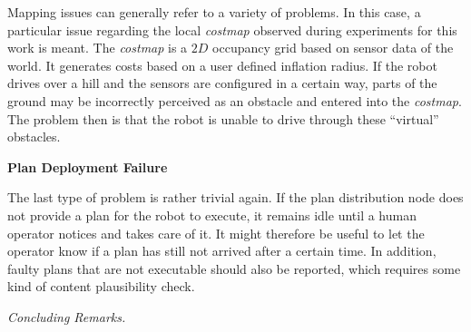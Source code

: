 \documentclass[english, master, utf8]{base/thesis_KBS}
\begin{document}
\noindent
Mapping issues can generally refer to a variety of problems. In this case, a particular issue regarding the local \textit{costmap} observed during experiments for this work is meant.
The \textit{costmap} is a $2D$ occupancy grid based on sensor data of the world. It generates costs based on a user defined inflation radius.
If the robot drives over a hill and the sensors are configured in a certain way, parts of the ground may be incorrectly perceived as an obstacle and entered into the \textit{costmap}.
The problem then is that the robot is unable to drive through these ``virtual'' obstacles. 

\vfill
\pagebreak

\noindent
\textbf{Plan Deployment Failure}\newline

\noindent
The last type of problem is rather trivial again. If the plan distribution node does not provide a plan for the robot to execute, it remains idle until a human operator 
notices and takes care of it. It might therefore be useful to let the operator know if a plan has still not arrived after a certain time.
In addition, faulty plans that are not executable should also be reported, which requires some kind of content plausibility check.\newline

\noindent
\textit{Concluding Remarks.}\newline
\end{document}
